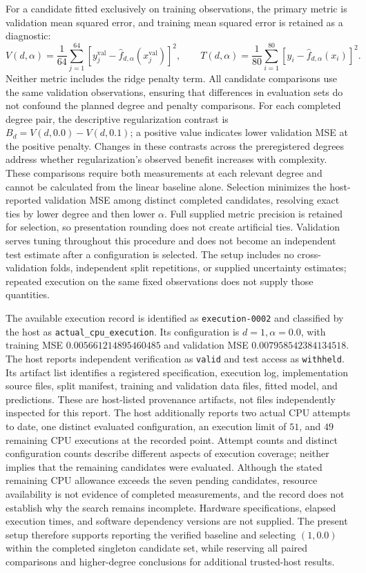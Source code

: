 \documentclass[11pt]{article}
\begin{document}
For a candidate fitted exclusively on training observations, the primary metric is validation mean squared error, and training mean squared error is retained as a diagnostic:
\[
V(d,\alpha)=\frac{1}{64}\sum_{j=1}^{64}
\left[y_j^{\mathrm{val}}-\widehat f_{d,\alpha}
(x_j^{\mathrm{val}})\right]^2,
\qquad
T(d,\alpha)=\frac{1}{80}\sum_{i=1}^{80}
\left[y_i-\widehat f_{d,\alpha}(x_i)\right]^2.
\]
Neither metric includes the ridge penalty term. All candidate comparisons use the same validation observations, ensuring that differences in evaluation sets do not confound the planned degree and penalty comparisons. For each completed degree pair, the descriptive regularization contrast is \(B_d=V(d,0.0)-V(d,0.1)\); a positive value indicates lower validation MSE at the positive penalty. Changes in these contrasts across the preregistered degrees address whether regularization's observed benefit increases with complexity. These comparisons require both measurements at each relevant degree and cannot be calculated from the linear baseline alone. Selection minimizes the host-reported validation MSE among distinct completed candidates, resolving exact ties by lower degree and then lower \(\alpha\). Full supplied metric precision is retained for selection, so presentation rounding does not create artificial ties. Validation serves tuning throughout this procedure and does not become an independent test estimate after a configuration is selected. The setup includes no cross-validation folds, independent split repetitions, or supplied uncertainty estimates; repeated execution on the same fixed observations does not supply those quantities.

The available execution record is identified as \texttt{execution-0002} and classified by the host as \texttt{actual\_cpu\_execution}. Its configuration is \(d=1,\alpha=0.0\), with training MSE \(0.005661214895460485\) and validation MSE \(0.007958542384134518\). The host reports independent verification as \texttt{valid} and test access as \texttt{withheld}. Its artifact list identifies a registered specification, execution log, implementation source files, split manifest, training and validation data files, fitted model, and predictions. These are host-listed provenance artifacts, not files independently inspected for this report. The host additionally reports two actual CPU attempts to date, one distinct evaluated configuration, an execution limit of \(51\), and \(49\) remaining CPU executions at the recorded point. Attempt counts and distinct configuration counts describe different aspects of execution coverage; neither implies that the remaining candidates were evaluated. Although the stated remaining CPU allowance exceeds the seven pending candidates, resource availability is not evidence of completed measurements, and the record does not establish why the search remains incomplete. Hardware specifications, elapsed execution times, and software dependency versions are not supplied. The present setup therefore supports reporting the verified baseline and selecting \((1,0.0)\) within the completed singleton candidate set, while reserving all paired comparisons and higher-degree conclusions for additional trusted-host results.
\end{document}
